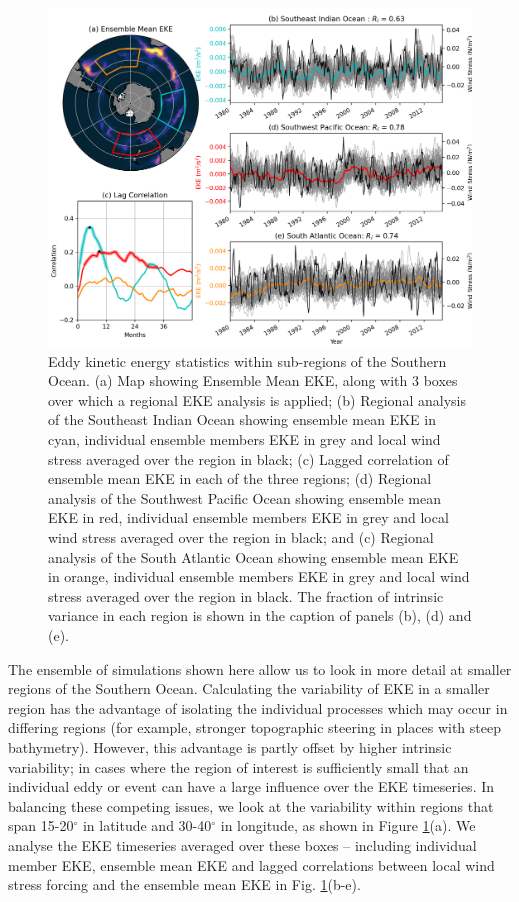 \documentclass{agujournal2019}
\begin{document}
\begin{figure}[t]
\begin{center}
\includegraphics[width=\hsize]{Figure3}
\caption{Eddy kinetic energy statistics within sub-regions of the Southern Ocean. (a) Map showing Ensemble Mean EKE, along with 3 boxes over which a regional EKE analysis is applied; (b) Regional analysis of the Southeast Indian Ocean showing ensemble mean EKE in cyan, individual ensemble members EKE in grey and local wind stress averaged over the region in black; (c) Lagged correlation of ensemble mean EKE in each of the three regions; (d) Regional analysis of the Southwest Pacific Ocean showing ensemble mean EKE in red, individual ensemble members EKE in grey and local wind stress averaged over the region in black; and (c) Regional analysis of the South Atlantic Ocean showing ensemble mean EKE in orange, individual ensemble members EKE in grey and local wind stress averaged over the region in black. The fraction of intrinsic variance in each region is shown in the caption of panels (b), (d) and (e).}
\label{Fig:3}
\end{center}
\end{figure}

The ensemble of simulations shown here allow us to look in more detail at smaller regions of the Southern Ocean.
Calculating the variability of EKE in a smaller region has the advantage of isolating the individual processes which may occur in differing regions (for example, stronger topographic steering in places with steep bathymetry).
However, this advantage is partly offset by higher intrinsic variability;  in cases where the region of interest is sufficiently small that an individual eddy or event can have a large influence over the EKE timeseries.
In balancing these competing issues, we look at the variability within regions that span 15-20$^\circ$ in latitude and 30-40$^\circ$ in longitude, as shown in Figure \ref{Fig:3}(a).
We analyse the EKE timeseries averaged over these boxes -- including individual member EKE, ensemble mean EKE and lagged correlations between local wind stress forcing and the ensemble mean EKE in Fig. \ref{Fig:3}(b-e).
\end{document}
